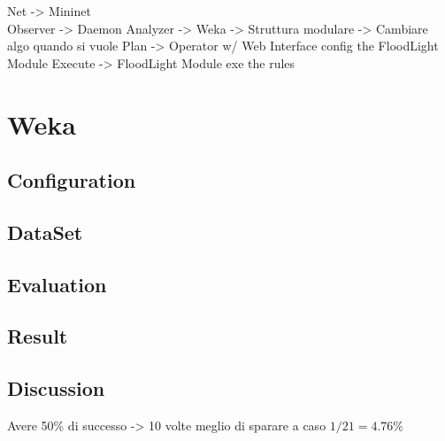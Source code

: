 \documentclass[12pt]{article}
\begin{document}
 






Net -> Mininet\\
Observer -> Daemon
Analyzer -> Weka -> Struttura modulare -> Cambiare algo quando si vuole
Plan -> Operator w/ Web Interface config the FloodLight Module
Execute -> FloodLight Module exe the rules
\section{Weka}
\subsection{Configuration}
\subsection{DataSet}
\subsection{Evaluation}
\subsection{Result}
\subsection{Discussion}
Avere 50\% di successo -> 10 volte meglio di sparare a caso $1/21 = 4.76\%$
	
	
\end{document}
